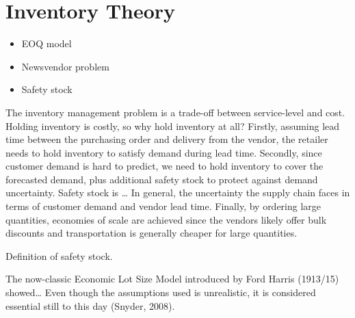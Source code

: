 \documentclass[../../main.tex]{subfiles}
\begin{document}

\section{Inventory Theory}

\begin{itemize}
\item EOQ model
\item Newsvendor problem
\item Safety stock
\end{itemize}


The inventory management problem is a trade-off between service-level and cost. Holding inventory is costly, so why hold inventory at all? Firstly, assuming lead time between the purchasing order and delivery from the vendor, the retailer needs to hold inventory to satisfy demand during lead time. Secondly, since customer demand is hard to predict, we need to hold inventory to cover the forecasted demand, plus additional safety stock to protect against demand uncertainty. Safety stock is … In general, the uncertainty the supply chain faces in terms of customer demand and vendor lead time. Finally, by ordering large quantities, economies of scale are achieved since the vendors likely offer bulk discounts and transportation is generally cheaper for large quantities. 

Definition of safety stock.

The now-classic Economic Lot Size Model introduced by Ford Harris (1913/15) showed… Even though the assumptions used is unrealistic, it is considered essential still to this day (Snyder, 2008).

\end{document}
